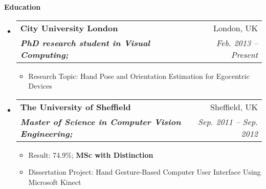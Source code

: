 \documentclass[letterpaper,11pt]{article}
\makeatletter
\newcommand{\resitem}[1]{\item #1 \vspace{-2pt}}
\newcommand{\resheading}[1]{{\large \colorbox{mygrey}{\begin{minipage}{\textwidth}{\textbf{#1 \vphantom{p\^{E}}}}\end{minipage}}}}
\newcommand{\ressubheading}[4]{
\begin{tabular*}{6.5in}{l@{\extracolsep{\fill}}r}
		\textbf{#1} & #2 \\
		\textit{#3} & \textit{#4} \\
\end{tabular*}\vspace{-6pt}}
\makeatother
\begin{document}
\resheading{Education}
	\begin{itemize}
	\item
			\ressubheading{City University London}{London, UK}{\textbf{PhD research student in Visual Computing;}}{Feb. 2013 -- Present}
				{ \footnotesize
				\begin{itemize}					
					\resitem{Research Topic: Hand Pose and Orientation Estimation for Egocentric Devices } 
							
						
				\end{itemize}
				}
		\item
			\ressubheading{The University of Sheffield}{Sheffield, UK}{\textbf{Master of Science in Computer Vision Engineering;}}{Sep. 2011 -- Sep. 2012}
				{ \footnotesize
				\begin{itemize}					

					\resitem{Result: 74.9\%; \textbf{MSc with Distinction}}
					\resitem{Dissertation Project: Hand Gesture-Based Computer User Interface Using Microsoft Kinect} 
				\end{itemize}
				}


\end{itemize}
\end{document}
